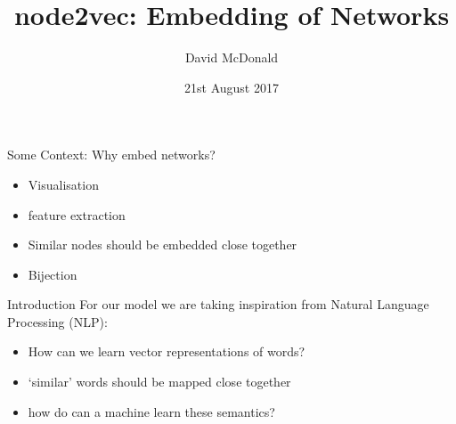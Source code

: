 \documentclass{beamer}
\title[node2vec]{node2vec: Embedding of Networks}
\author{David McDonald}
\date{21st August 2017}
\begin{document}
	
	\begin{frame}
		\titlepage
	\end{frame}

	\begin{frame}{Some Context: Why embed networks?}
		\begin{itemize}
			\item Visualisation
			\item feature extraction
			\item Similar nodes should be embedded close together
			\item Bijection
		\end{itemize}
	\end{frame}
	
	\begin{frame}{Introduction}
		For our model we are taking inspiration from Natural Language Processing (NLP):
		
		\begin{itemize}
			\item How can we learn vector representations of words?
			\item `similar' words should be mapped close together
			\item how do can a machine learn these semantics?
		\end{itemize}
		 
	\end{frame}
	
\end{document}
